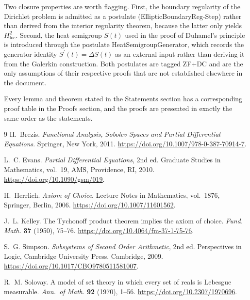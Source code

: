 \documentclass[11pt,reqno]{amsart}
\begin{document}
	Two closure properties are worth flagging. First, the boundary
	regularity of the Dirichlet problem is admitted as a postulate
	(\textsf{EllipticBoundaryReg-Step}) rather than derived from the interior
	regularity theorem, because the latter only yields
	$H^{2}_{\mathrm{loc}}$. Second, the heat semigroup $S(t)$ used in the
	proof of Duhamel's principle is introduced through the postulate
	\textsf{HeatSemigroupGenerator}, which records the generator identity
	$S^{\prime}(t)=\Delta S(t)$ as an external input rather than deriving it
	from the Galerkin construction. Both postulates are tagged
	\textsf{ZF+DC} and are the only assumptions of their respective proofs
	that are not established elsewhere in the document.
	
	Every lemma and theorem stated in the Statements section has a
	corresponding proof table in the Proofs section, and the proofs are
	presented in exactly the same order as the statements.
	
	\begin{thebibliography}{9}
		 H.~Brezis. \newblock \emph{Functional Analysis, Sobolev
			Spaces and Partial Differential Equations}. \newblock
		Springer, New York, 2011. \newblock
		\url{https://doi.org/10.1007/978-0-387-70914-7}. \medskip
		
		 L.~C. Evans. \newblock \emph{Partial Differential
			Equations}, 2nd ed. \newblock
		Graduate Studies in Mathematics, vol.~19, AMS, Providence, RI, 2010.
		\newblock
		\url{https://doi.org/10.1090/gsm/019}. \medskip
		
		 H.~Herrlich. \newblock \emph{Axiom of Choice}.
		\newblock
		Lecture Notes in Mathematics, vol.~1876, Springer, Berlin, 2006. \newblock
		\url{https://doi.org/10.1007/11601562}. \medskip
		
		 J.~L. Kelley. \newblock The Tychonoff product theorem
		implies the axiom of choice. \newblock
		\emph{Fund. Math.} \textbf{37} (1950), 75--76. \newblock
		\url{https://doi.org/10.4064/fm-37-1-75-76}. \medskip
		
		 S.~G. Simpson. \newblock \emph{Subsystems of Second
			Order Arithmetic}, 2nd ed. \newblock
		Perspectives in Logic, Cambridge University Press, Cambridge, 2009.
		\newblock
		\url{https://doi.org/10.1017/CBO9780511581007}. \medskip
		
		 R.~M. Solovay. \newblock A model of set theory in
		which every set of reals is Lebesgue measurable. \newblock
		\emph{Ann.\ of Math.} \textbf{92} (1970), 1--56. \newblock
		\url{https://doi.org/10.2307/1970696}.
	\end{thebibliography}
	
\end{document}
